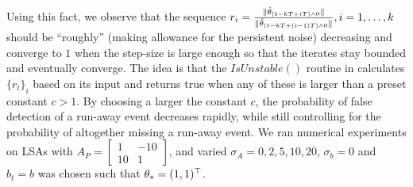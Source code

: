 Using this fact, we observe that the sequence $r_i=\frac{\| \hat{\theta}_{(t-kT+iT)\wedge 0}\|}{\| \hat{\theta}_{(t-kT+(i-1)T)\wedge 0}\|},i=1,\ldots,k$ should be ``roughly'' (making allowance for the persistent noise) decreasing and converge to $1$ when the step-size is large enough so that the iterates stay bounded and eventually converge. 
The idea is that the $IsUnstable()$ routine in  calculates $\{r_i\}_i$ based on its input and returns true when any of these is larger than a preset constant $c>1$. By choosing a larger the constant $c$, the probability of false detection of a run-away event decreases rapidly, while still controlling for the probability of altogether missing a run-away event.
We ran numerical experiments on LSAs with $A_{P}=\begin{bmatrix} 1 &-10\\ 10 &1\end{bmatrix}$, and varied $\sigma_A=0,2,5,10,20$, $\sigma_b=0$ and $b_t=b$ was chosen such that $\theta_*=(1,1)^\top$.


